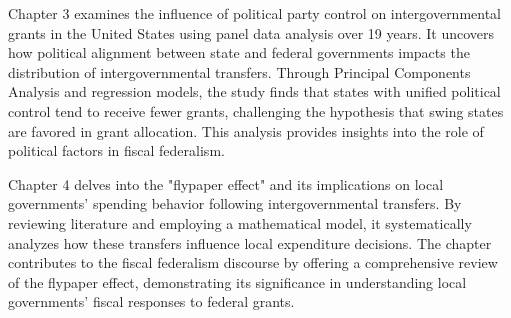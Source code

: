 
Chapter 3 examines the influence of political party control on intergovernmental grants in the United States using panel data analysis over 19 years. It uncovers how political alignment between state and federal governments impacts the distribution of intergovernmental transfers. Through Principal Components Analysis and regression models, the study finds that states with unified political control tend to receive fewer grants, challenging the hypothesis that swing states are favored in grant allocation. This analysis provides insights into the role of political factors in fiscal federalism.



Chapter 4 delves into the "flypaper effect" and its implications on local governments' spending behavior following intergovernmental transfers. By reviewing literature and employing a mathematical model, it systematically analyzes how these transfers influence local expenditure decisions. The chapter contributes to the fiscal federalism discourse by offering a comprehensive review of the flypaper effect, demonstrating its significance in understanding local governments' fiscal responses to federal grants.



